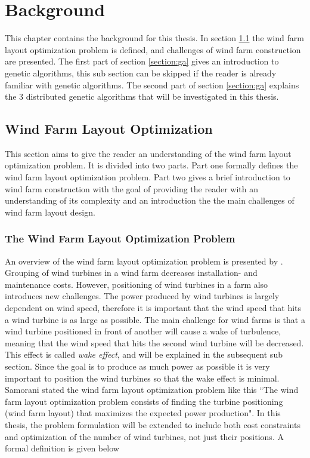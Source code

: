 \chapter{Background}\label{chapter:background}
This chapter contains the background for this thesis. In section \ref{section:wflo} the wind farm layout optimization problem is defined, and challenges of wind farm construction are presented. The first part of section \ref{section:ga} gives an introduction to genetic algorithms, this sub section can be skipped if the reader is already familiar with genetic algorithms. The second part of section \ref{section:ga} explains the 3 distributed genetic algorithms that will be investigated in this thesis.


\section{Wind Farm Layout Optimization}\label{section:wflo}
This section aims to give the reader an understanding of the wind farm layout optimization problem. It is divided into two parts. Part one formally defines the wind farm layout optimization problem. Part two gives a brief introduction to wind farm construction with the goal of providing the reader with an understanding of its complexity and an introduction the the main challenges of wind farm layout design.


\subsection{The Wind Farm Layout Optimization Problem}
An overview of the wind farm layout optimization problem is presented by \cite{Samorani}. Grouping of wind turbines in a wind farm decreases installation- and maintenance costs. However, positioning of wind turbines in a farm also introduces new challenges. The power produced by wind turbines is largely dependent on wind speed, therefore it is important that the wind speed that hits a wind turbine is as large as possible. The main challenge for wind farms is that a wind turbine positioned in front of another will cause a wake of turbulence, meaning that the wind speed that hits the second wind turbine will be decreased. This effect is called \textit{wake effect}, and will be explained in the subsequent sub section. Since the goal is to produce as much power as possible it is very important to position the wind turbines so that the wake effect is minimal. Samorani stated the wind farm layout optimization problem like this ``The wind farm layout optimization problem consists of finding the turbine positioning (wind farm layout) that maximizes the expected power production". In this thesis, the problem formulation will be extended to include both cost constraints and optimization of the number of wind turbines, not just their positions. A formal definition is given below


